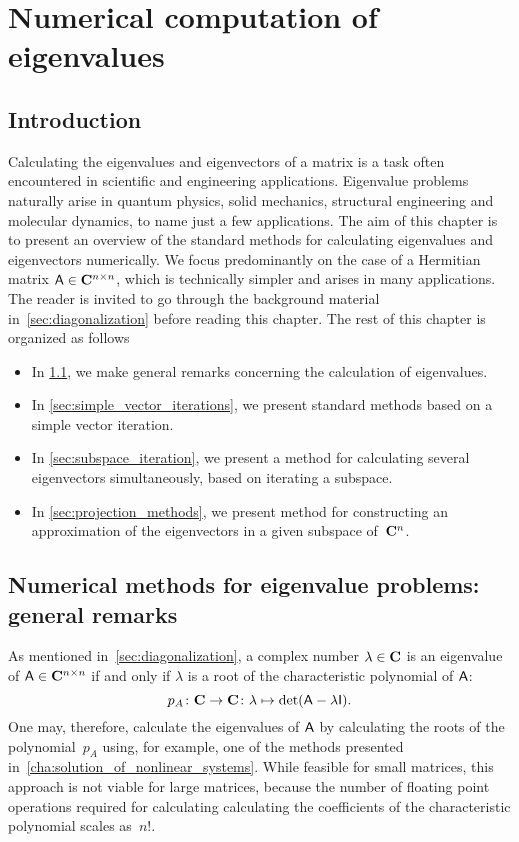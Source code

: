 \chapter{Numerical computation of eigenvalues}%
\label{cha:numerical_computation_of_eigenvalues}
\minitoc

\section*{Introduction}

Calculating the eigenvalues and eigenvectors of a matrix is a task often encountered in scientific and engineering applications.
Eigenvalue problems naturally arise in quantum physics,
solid mechanics, structural engineering and molecular dynamics,
to name just a few applications.
The aim of this chapter is to present an overview of the standard methods for calculating eigenvalues and eigenvectors numerically.
We focus predominantly on the case of a Hermitian matrix $\mathsf A \in \mathbf C^{n \times n}$,
which is technically simpler and arises in many applications.
The reader is invited to go through the background material in~\cref{sec:diagonalization} before reading this chapter.
The rest of this chapter is organized as follows
\begin{itemize}
    \item
        In \cref{sec:general_remarks},
        we make general remarks concerning the calculation of eigenvalues.

    \item
        In \cref{sec:simple_vector_iterations},
        we present standard methods based on a simple vector iteration.

    \item
        In \cref{sec:subspace_iteration},
        we present a method for calculating several eigenvectors simultaneously,
        based on iterating a subspace.

    \item
        In \cref{sec:projection_methods},
        we present method for constructing an approximation of the eigenvectors in a given subspace of~$\mathbf C^{n}$.
\end{itemize}

\section{Numerical methods for eigenvalue problems: general remarks}
\label{sec:general_remarks}

As mentioned in~\cref{sec:diagonalization},
a complex number $\lambda \in \mathbf C$ is an eigenvalue of $\mathsf A \in \mathbf C^{n \times n}$
if and only if $\lambda$ is a root of the characteristic polynomial of $\mathsf A$:
\[
    p_A
    \colon \mathbf C \to \mathbf C
    \colon \lambda \mapsto \det (\mathsf A - \lambda \mathsf I).
\]
One may,
therefore,
calculate the eigenvalues of $\mathsf A$ by calculating the roots of the polynomial~$p_A$ using,
for example, one of the methods presented in~\cref{cha:solution_of_nonlinear_systems}.
While feasible for small matrices,
this approach is not viable for large matrices,
because the number of floating point operations required for calculating calculating the coefficients of the characteristic polynomial scales as~$n!$.

